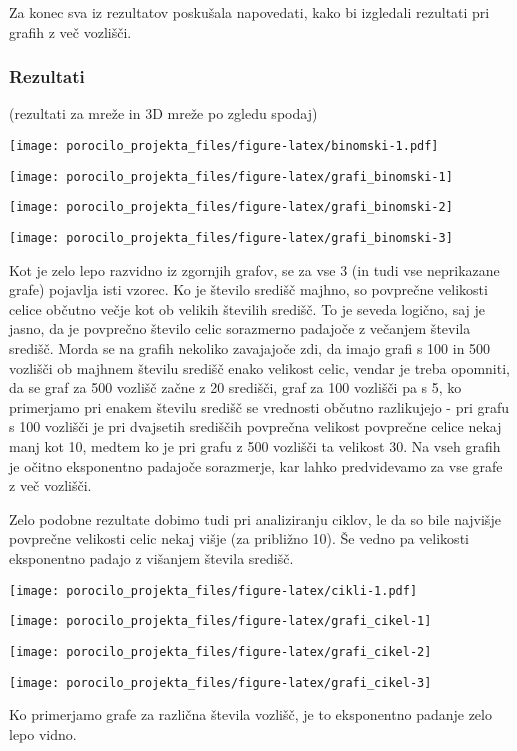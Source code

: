 \documentclass[
]{article}
\begin{document}
Za konec sva iz rezultatov poskušala napovedati, kako bi izgledali
rezultati pri grafih z več vozlišči.

\hypertarget{rezultati}{%
\subsubsection{Rezultati}\label{rezultati}}

(rezultati za mreže in 3D mreže po zgledu spodaj)

\texttt{[image: porocilo\_projekta\_files/figure-latex/binomski-1.pdf]}

\begin{center}\texttt{[image: porocilo\_projekta\_files/figure-latex/grafi\_binomski-1]} \end{center}

\begin{center}\texttt{[image: porocilo\_projekta\_files/figure-latex/grafi\_binomski-2]} \end{center}

\begin{center}\texttt{[image: porocilo\_projekta\_files/figure-latex/grafi\_binomski-3]} \end{center}

Kot je zelo lepo razvidno iz zgornjih grafov, se za vse 3 (in tudi vse
neprikazane grafe) pojavlja isti vzorec. Ko je število središč majhno,
so povprečne velikosti celice občutno večje kot ob velikih številih
središč. To je seveda logično, saj je jasno, da je povprečno število
celic sorazmerno padajoče z večanjem števila središč. Morda se na grafih
nekoliko zavajajoče zdi, da imajo grafi s 100 in 500 vozlišči ob majhnem
številu središč enako velikost celic, vendar je treba opomniti, da se
graf za 500 vozlišč začne z 20 središči, graf za 100 vozlišči pa s 5, ko
primerjamo pri enakem številu središč se vrednosti občutno razlikujejo -
pri grafu s 100 vozlišči je pri dvajsetih središčih povprečna velikost
povprečne celice nekaj manj kot 10, medtem ko je pri grafu z 500
vozlišči ta velikost 30. Na vseh grafih je očitno eksponentno padajoče
sorazmerje, kar lahko predvidevamo za vse grafe z več vozlišči.

Zelo podobne rezultate dobimo tudi pri analiziranju ciklov, le da so
bile najvišje povprečne velikosti celic nekaj višje (za približno 10).
Še vedno pa velikosti eksponentno padajo z višanjem števila središč.

\texttt{[image: porocilo\_projekta\_files/figure-latex/cikli-1.pdf]}

\begin{center}\texttt{[image: porocilo\_projekta\_files/figure-latex/grafi\_cikel-1]} \end{center}

\begin{center}\texttt{[image: porocilo\_projekta\_files/figure-latex/grafi\_cikel-2]} \end{center}

\begin{center}\texttt{[image: porocilo\_projekta\_files/figure-latex/grafi\_cikel-3]} \end{center}

Ko primerjamo grafe za različna števila vozlišč, je to eksponentno
padanje zelo lepo vidno.
\end{document}
